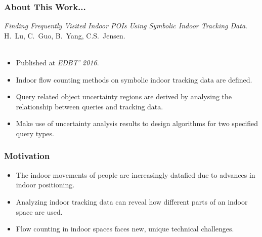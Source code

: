 \begin{frame}
\frametitle{About This Work...}

\emph{Finding Frequently Visited Indoor POIs Using Symbolic Indoor Tracking Data}.~\cite{lu2016finding} \\
H.~Lu, C.~Guo, B.~Yang, C.S.~Jensen.\\~\\

\begin{itemize}
  \item Published at \emph{EDBT' 2016}.
  \item Indoor flow counting methods on symbolic indoor tracking data are defined.
  \item Query related object uncertainty regions are derived by analysing the relationship between queries and tracking data.
  \item Make use of uncertainty analysis results to design algorithms for two specified query types.
\end{itemize}

\end{frame}


\begin{frame}
\frametitle{Motivation}

\begin{itemize}
  \setlength{\itemsep}{15pt}
  \item The indoor movements of people are increasingly datafied due to advances in indoor positioning.\cite{InLoc0:online}

  \item Analyzing indoor tracking data can reveal how different parts of an indoor space are used.

  \item Flow counting in indoor spaces faces new, unique technical challenges.
\end{itemize}

\end{frame}

